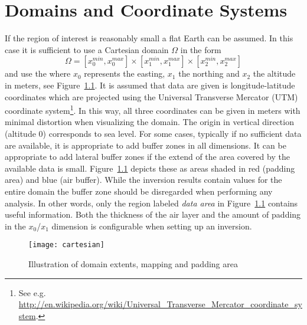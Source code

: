 \chapter{Domains and Coordinate Systems}\label{Chp:ref:coordinates}

If the region of interest is reasonably small a flat Earth can be assumed. In this case
it is sufficient to use a Cartesian domain $\Omega$ in the form
\begin{equation} \label{REF:EQU:INTRO 8}
\Omega = [x^{min}_0, x^{max}_0] \times
 [x^{min}_1, x^{max}_1] \times
 [x^{min}_2, x^{max}_2] 
\end{equation} 
and use the 
where $x_0$ represents the easting, $x_1$ the northing and $x_2$ the altitude in meters, see Figure~\ref{fig:cartesianDomain}.
It is assumed that data are given is longitude-latitude coordinates which are projected using the   
Universal Transverse Mercator (UTM) coordinate system\footnote{See
    e.g. \url{http://en.wikipedia.org/wiki/Universal_Transverse_Mercator_coordinate_system}.}. 
In this way, all three coordinates can be given in meters with minimal
distortion when visualizing the domain.
The origin in vertical direction (altitude 0) corresponds to sea level.
For some cases, typically if no sufficient data are available, it is appropriate 
to add buffer zones in all dimensions. It can be appropriate to add lateral buffer zones if the 
extend of the area covered by the available data is small. 
Figure~\ref{fig:cartesianDomain} depicts these as areas shaded in red (padding
area) and blue (air buffer).
While the inversion results contain values for the entire domain the buffer zone
should be disregarded when performing any analysis.
In other words, only the region labeled \emph{data area} in
Figure~\ref{fig:cartesianDomain} contains useful information.
Both the thickness of the air layer and the amount of padding in the $x_0$/$x_1$
dimension is configurable when setting up an inversion.

\begin{figure}[ht]
    \centering\texttt{[image: cartesian]}
    \caption{Illustration of domain extents, mapping and padding area}
    \label{fig:cartesianDomain}
\end{figure}

